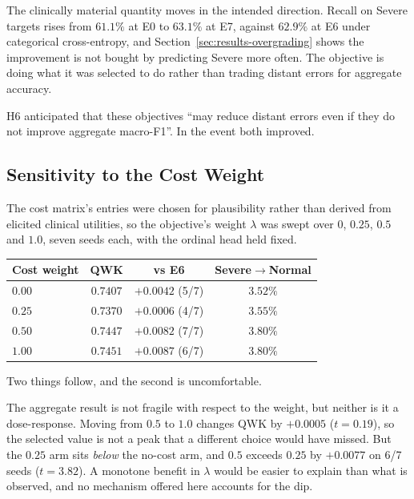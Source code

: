 \documentclass[12pt,a4paper]{report}
\begin{document}
The clinically material quantity moves in the intended direction. Recall on
Severe targets rises from $61.1\%$ at E0 to $63.1\%$ at E7, against $62.9\%$ at
E6 under categorical cross-entropy, and Section~\ref{sec:results-overgrading}
shows the improvement is not bought by predicting Severe more often. The
objective is doing what it was selected to do rather than trading distant errors
for aggregate accuracy.

H6 anticipated that these objectives \enquote{may reduce distant errors even if
they do not improve aggregate macro-F1}. In the event both improved.

\subsection{Sensitivity to the Cost Weight}
\label{sec:results-rq5-sweep}

The cost matrix's entries were chosen for plausibility rather than derived from
elicited clinical utilities, so the objective's weight $\lambda$ was swept over
$0$, $0.25$, $0.5$ and $1.0$, seven seeds each, with the ordinal head held
fixed.

\begin{center}
\begin{tabular}{lccc}
\toprule
Cost weight & QWK & vs E6 & Severe$\rightarrow$Normal \\
\midrule
$0.00$ & $0.7407$ & $+0.0042$ (5/7) & $\mathbf{3.52\%}$ \\
$0.25$ & $0.7370$ & $+0.0006$ (4/7) & $3.55\%$ \\
$0.50$ & $\mathbf{0.7447}$ & $\mathbf{+0.0082}$ (7/7) & $3.80\%$ \\
$1.00$ & $0.7451$ & $+0.0087$ (6/7) & $3.80\%$ \\
\bottomrule
\end{tabular}
\end{center}

Two things follow, and the second is uncomfortable.

The aggregate result is not fragile with respect to the weight, but neither is it
a dose-response. Moving from $0.5$ to $1.0$ changes QWK by $+0.0005$
($t = 0.19$), so the selected value is not a peak that a different choice would
have missed. But the $0.25$ arm sits \emph{below} the no-cost arm, and $0.5$
exceeds $0.25$ by $+0.0077$ on 6/7 seeds ($t = 3.82$). A monotone benefit in
$\lambda$ would be easier to explain than what is observed, and no mechanism
offered here accounts for the dip.
\end{document}
